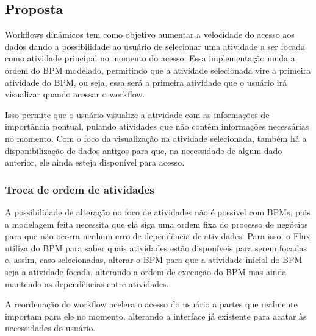 \subsection{Proposta}

Workflows dinâmicos tem como objetivo aumentar a velocidade do acesso aos dados dando a possibilidade ao usuário de selecionar uma atividade a ser focada como atividade principal no momento do acesso. Essa implementação muda a ordem do BPM modelado, permitindo que a atividade selecionada vire a primeira atividade do BPM, ou seja, essa será a primeira atividade que o usuário irá visualizar quando acessar o workflow.

Isso permite que o usuário visualize a atividade com as informações de importância pontual, pulando atividades que não contêm informações necessárias no momento. Com o foco da visualização na atividade selecionada, também há a disponibilização de dados antigos para que, na necessidade de algum dado anterior, ele ainda esteja disponível para acesso.

\subsubsection{Troca de ordem de atividades}




A possibilidade de alteração no foco de atividades não é possível com BPMs, pois a modelagem feita necessita que ela siga uma ordem fixa do processo de negócios para que não ocorra nenhum erro de dependência de atividades. Para isso, o Flux utiliza do BPM para saber quais atividades estão disponíveis para serem focadas e, assim, caso selecionadas, alterar o BPM para que a atividade inicial do BPM seja a atividade focada, alterando a ordem de execução do BPM mas ainda mantendo as dependências entre atividades.



A reordenação do workflow acelera o acesso do usuário a partes que realmente importam para ele no momento, alterando a interface já existente para acatar às necessidades do usuário.

